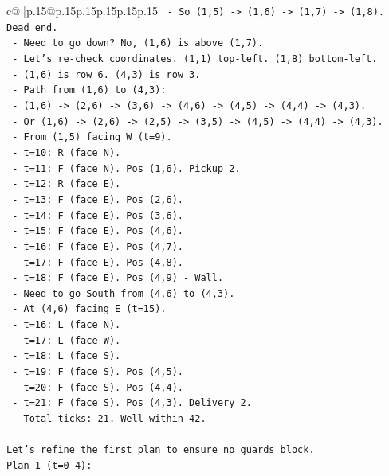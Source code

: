 \documentclass{article}
\begin{document}
{\begin{supertabular}{c@{$\;$}|p{.15\linewidth}@{}p{.15\linewidth}p{.15\linewidth}p{.15\linewidth}p{.15\linewidth}p{.15\linewidth}}
{{{\texttt{  {-} So (1,5) {-}> (1,6) {-}> (1,7) {-}> (1,8). Dead end.} \\
\texttt{  {-} Need to go down? No, (1,6) is above (1,7).} \\
\texttt{  {-} Let's re{-}check coordinates. (1,1) top{-}left. (1,8) bottom{-}left.} \\
\texttt{  {-} (1,6) is row 6. (4,3) is row 3.} \\
\texttt{  {-} Path from (1,6) to (4,3):} \\
\texttt{    {-} (1,6) {-}> (2,6) {-}> (3,6) {-}> (4,6) {-}> (4,5) {-}> (4,4) {-}> (4,3).} \\
\texttt{    {-} Or (1,6) {-}> (2,6) {-}> (2,5) {-}> (3,5) {-}> (4,5) {-}> (4,4) {-}> (4,3).} \\
\texttt{  {-} From (1,5) facing W (t=9).} \\
\texttt{  {-} t=10: R (face N).} \\
\texttt{  {-} t=11: F (face N). Pos (1,6). Pickup 2.} \\
\texttt{  {-} t=12: R (face E).} \\
\texttt{  {-} t=13: F (face E). Pos (2,6).} \\
\texttt{  {-} t=14: F (face E). Pos (3,6).} \\
\texttt{  {-} t=15: F (face E). Pos (4,6).} \\
\texttt{  {-} t=16: F (face E). Pos (4,7).} \\
\texttt{  {-} t=17: F (face E). Pos (4,8).} \\
\texttt{  {-} t=18: F (face E). Pos (4,9) {-} Wall.} \\
\texttt{  {-} Need to go South from (4,6) to (4,3).} \\
\texttt{  {-} At (4,6) facing E (t=15).} \\
\texttt{  {-} t=16: L (face N).} \\
\texttt{  {-} t=17: L (face W).} \\
\texttt{  {-} t=18: L (face S).} \\
\texttt{  {-} t=19: F (face S). Pos (4,5).} \\
\texttt{  {-} t=20: F (face S). Pos (4,4).} \\
\texttt{  {-} t=21: F (face S). Pos (4,3). Delivery 2.} \\
\texttt{  {-} Total ticks: 21. Well within 42.} \\
\\ 
\texttt{Let's refine the first plan to ensure no guards block.} \\
\texttt{Plan 1 (t=0{-}4):} \\
}}}
\end{supertabular}}
\end{document}
